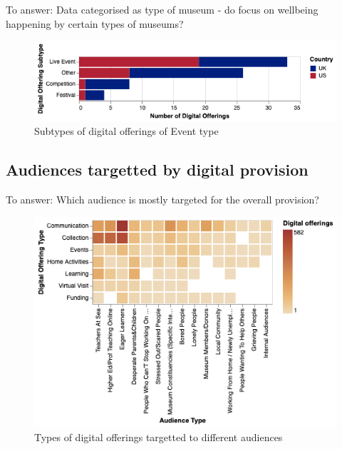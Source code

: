 \documentclass{egpubl}
\begin{document}
\color{red}To answer: Data  categorised  as  type of museum - do focus on wellbeing happening by certain types of museums?\color{black}

\begin{figure}[h]
  \centering
  \includegraphics[width=\linewidth]{images/event.png}
  \caption{\label{fig:DigOffType} 
           Subtypes of digital offerings of Event type}
\end{figure}

\subsection{Audiences targetted by digital provision}
\color{red}To answer: Which audience is mostly targeted for the overall provision?\color{black}

\begin{figure}[h]
  \centering
  \includegraphics[width=\linewidth]{images/typeaudience.png}
  \caption{\label{fig:DigOffType}
           Types of digital offerings targetted to different audiences
           }
\end{figure}
\end{document}
